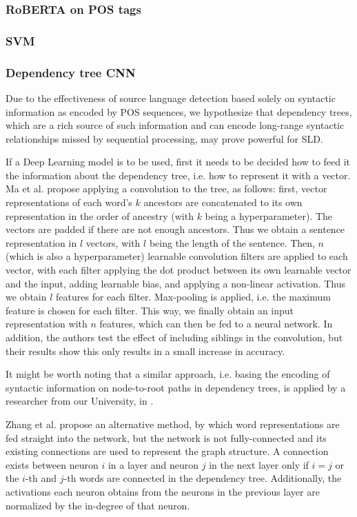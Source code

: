 \documentclass[twocolumn]{article}
\begin{document}
\subsubsection*{RoBERTA on POS tags}

\subsubsection*{SVM}

\subsubsection*{Dependency tree CNN}

Due to the effectiveness of source language detection based solely on syntactic information as encoded by POS sequences, we hypothesize that dependency trees, which are a rich source of such information and can encode long-range syntactic relationships missed by sequential processing, may prove powerful for SLD.

If a Deep Learning model is to be used, first it needs to be decided how to feed it the information about the dependency tree, i.e. how to represent it with a vector. Ma et al. \cite{ancestors} propose applying a convolution to the tree, as follows: first, vector representations of each word's $k$ ancestors are concatenated to its own representation in the order of ancestry (with $k$ being a hyperparameter). The vectors are padded if there are not enough ancestors. Thus we obtain a sentence representation in $l$ vectors, with $l$ being the length of the sentence. Then, $n$ (which is also a hyperparameter) learnable convolution filters are applied to each vector, with each filter applying the dot product between its own learnable vector and the input, adding learnable bias, and applying a non-linear activation. Thus we obtain $l$ features for each filter. Max-pooling is applied, i.e. the maximum feature is chosen for each filter. This way, we finally obtain an input representation with $n$ features, which can then be fed to a neural network. In addition, the authors test the effect of including siblings in the convolution, but their results show this only results in a small increase in accuracy.

It might be worth noting that a similar approach, i.e. basing the encoding of syntactic information on node-to-root paths in dependency trees, is applied by a researcher from our University, in \cite{kgan}.

Zhang et al. \cite{adjacency} propose an alternative method, by which word representations are fed straight into the network, but the network is not fully-connected and its existing connections are used to represent the graph structure. A connection exists between neuron $i$ in a layer and neuron $j$ in the next layer only if $i=j$ or the $i$-th and $j$-th words are connected in the dependency tree. Additionally, the activations each neuron obtains from the neurons in the previous layer are normalized by the in-degree of that neuron.
\end{document}
